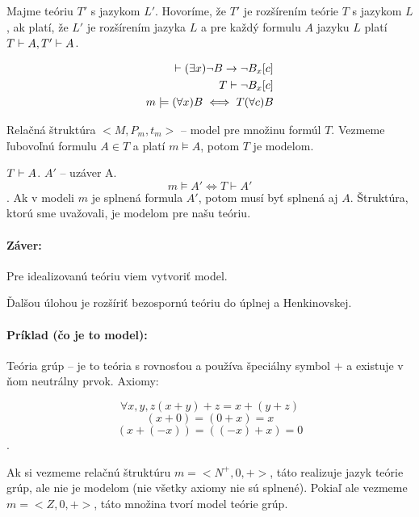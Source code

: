 \begin{definicia}
    Majme teóriu $T'$ s jazykom $L'$. Hovoríme, že $T'$ je
    rozšírením teórie $T$ s jazykom $L$, ak platí,
    že $L'$ je rozšírením jazyka $L$ a pre každý formulu $A$ jazyku $L$
    platí $T \vdash A, T' \vdash A$. 
\end{definicia}


\begin{veta}[Henkinova]

    \begin{align*}
        \vdash (\exists x) \neg B \rightarrow \neg B_x[c] \\
        T \vdash  \neg B_x[c] \\
        m \models  (\forall x) B \iff T (\forall c) B \\
    \end{align*}
\end{veta}


\par Relačná štruktúra $<M, P_m, t_m>$ -- model pre množinu formúl $T$. Vezmeme
ľubovoľnú formulu $A \in T$ a platí $m \models A$, potom $T$ je modelom.

\par $T \vdash A$. $A'$ -- uzáver A. $$ m \models A' \iff T \vdash A'$$. Ak v
modeli $m$ je splnená formula $A'$, potom musí byť splnená aj $A$. Štruktúra,
ktorú sme uvažovali, je modelom pre našu teóriu.

\paragraph{Záver:} Pre idealizovanú teóriu viem vytvoriť model.

\par Ďalšou úlohou je rozšíriť bezospornú teóriu do úplnej a Henkinovskej.

\paragraph{Príklad (čo je to model):} Teória grúp -- je to teória s rovnosťou a
používa špeciálny symbol $+$ a existuje v ňom neutrálny prvok. Axiomy:

$$\forall x,y,z (x+y)+z = x+(y+z)$$
$$(x+0) = (0+x) = x$$
$$(x+(-x)) = ((-x)+x) = 0$$.

\par Ak si vezmeme relačnú štruktúru $m=<N^+,0,+>$, táto realizuje jazyk teórie
grúp, ale nie je modelom (nie všetky axiomy nie sú splnené). Pokiaľ ale vezmeme
$m=<Z,0,+>$, táto množina tvorí model teórie grúp.  

